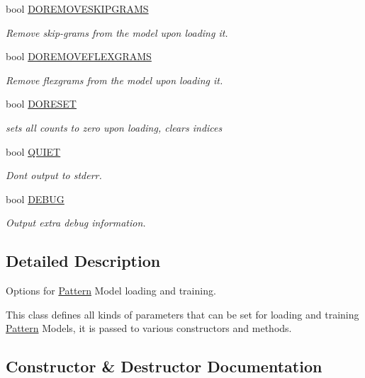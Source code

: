 \begin{DoxyCompactItemize}
bool \hyperlink{classPatternModelOptions_a88eb47abf2e38a2afac00e8cb9a7a869}{D\+O\+R\+E\+M\+O\+V\+E\+S\+K\+I\+P\+G\+R\+A\+M\+S}
\begin{DoxyCompactList}\small\item\em Remove skip-\/grams from the model upon loading it. \end{DoxyCompactList}\item 
bool \hyperlink{classPatternModelOptions_a82fad4131fd2b0a41a81f65586ae9378}{D\+O\+R\+E\+M\+O\+V\+E\+F\+L\+E\+X\+G\+R\+A\+M\+S}
\begin{DoxyCompactList}\small\item\em Remove flexgrams from the model upon loading it. \end{DoxyCompactList}\item 
bool \hyperlink{classPatternModelOptions_a52b76b6c81b7666c997ca05bc1df7e97}{D\+O\+R\+E\+S\+E\+T}
\begin{DoxyCompactList}\small\item\em sets all counts to zero upon loading, clears indices \end{DoxyCompactList}\item 
bool \hyperlink{classPatternModelOptions_ad99d007239e6ef18a6fd8ce51fb9d1bd}{Q\+U\+I\+E\+T}
\begin{DoxyCompactList}\small\item\em Don\textquotesingle{}t output to stderr. \end{DoxyCompactList}\item 
bool \hyperlink{classPatternModelOptions_ae0019dce9d441e011dab04dea4fa8d46}{D\+E\+B\+U\+G}
\begin{DoxyCompactList}\small\item\em Output extra debug information. \end{DoxyCompactList}\end{DoxyCompactItemize}


\subsection{Detailed Description}
Options for \hyperlink{classPattern}{Pattern} Model loading and training. 

This class defines all kinds of parameters that can be set for loading and training \hyperlink{classPattern}{Pattern} Models, it is passed to various constructors and methods. 

\subsection{Constructor \& Destructor Documentation}
\hypertarget{classPatternModelOptions_a32b803262231539a8cd3d715dea7ee81}{}
